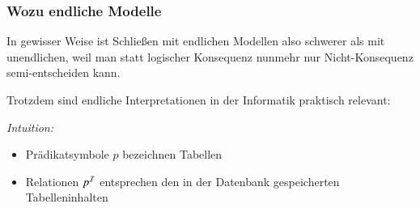 \documentclass[aspectratio=1610,onlymath]{beamer}
\begin{document}

\begin{frame}\frametitle{Wozu endliche Modelle}

In gewisser Weise ist Schließen mit endlichen Modellen also schwerer als mit unendlichen, weil man statt logischer Konsequenz nunmehr nur Nicht-Konsequenz semi-entscheiden kann.
\bigskip

Trotzdem sind endliche Interpretationen in der Informatik praktisch relevant:\medskip

\emph{Intuition:}
\begin{itemize}
\item Prädikatsymbole $p$ bezeichnen Tabellen
\item Relationen $p^{\mathcal{I}}$ entsprechen den in der Datenbank gespeicherten Tabelleninhalten
\end{itemize}

\end{frame}
\end{document}
